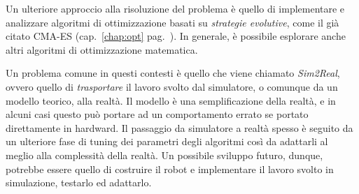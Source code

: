 Un ulteriore approccio alla risoluzione del problema è quello di implementare e analizzare algoritmi di
ottimizzazione basati su \textit{strategie evolutive}, come il già citato CMA-ES (cap.~\ref{chap:opt}
pag.~\pageref{chap:opt}). \cite{lection22} In generale, è possibile esplorare anche altri algoritmi di
ottimizzazione matematica.

\bigskip
\noindent Un problema comune in questi contesti è quello che viene chiamato \textit{Sim2Real}, ovvero quello di \textit{trasportare}
il lavoro svolto dal simulatore, o comunque da un modello teorico, alla realtà. Il modello è una
semplificazione della realtà, e in alcuni casi questo può portare ad un comportamento errato se portato
direttamente in hardward. Il passaggio da simulatore a realtà spesso è seguito da un ulteriore fase di
tuning dei parametri degli algoritmi così da adattarli al meglio alla complessità della realtà. Un
possibile sviluppo futuro, dunque, potrebbe essere quello di costruire il robot e implementare il lavoro
svolto in simulazione, testarlo ed adattarlo.
